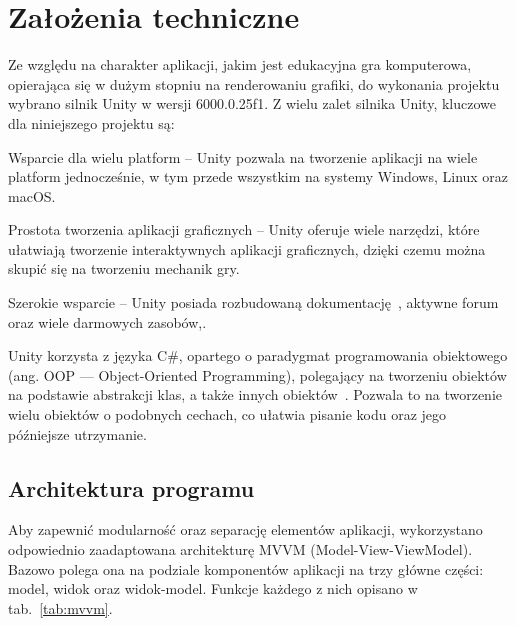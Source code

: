 \section{Założenia techniczne}
\label{sec:zalozenia_techniczne}

Ze względu na charakter aplikacji, jakim jest edukacyjna gra komputerowa,
opierająca się w dużym stopniu na renderowaniu grafiki,
do wykonania projektu wybrano silnik Unity w wersji 6000.0.25f1.
Z wielu zalet silnika Unity, kluczowe dla niniejszego projektu są:

\begin{citemize}
    \item Wsparcie dla wielu platform --
    Unity pozwala na tworzenie aplikacji na wiele platform jednocześnie, w tym przede wszystkim na systemy Windows, Linux oraz macOS.
    \item Prostota tworzenia aplikacji graficznych --
    Unity oferuje wiele narzędzi, które ułatwiają tworzenie interaktywnych aplikacji graficznych,
    dzięki czemu można skupić się na tworzeniu mechanik gry.
    \item Szerokie wsparcie --
    Unity posiada rozbudowaną dokumentację~\cite{unity_docs}, aktywne forum~\cite{unity_forum} oraz wiele darmowych zasobów,.
\end{citemize}

Unity korzysta z języka C\#, opartego o paradygmat programowania obiektowego (ang. OOP — Object-Oriented Programming),
polegający na tworzeniu obiektów na podstawie abstrakcji klas, a także innych obiektów~\cite{nygaard1986basic}.
Pozwala to na tworzenie wielu obiektów o podobnych cechach, co ułatwia pisanie kodu oraz jego późniejsze utrzymanie.\\

\subsection{Architektura programu}
\label{subsec:architektura_programu}

Aby zapewnić modularność oraz separację elementów aplikacji,
wykorzystano odpowiednio zaadaptowana architekturę MVVM (Model-View-ViewModel).
Bazowo polega ona na podziale komponentów aplikacji na trzy główne części: model, widok oraz widok-model.
Funkcje każdego z nich opisano w tab.~\ref{tab:mvvm}.

